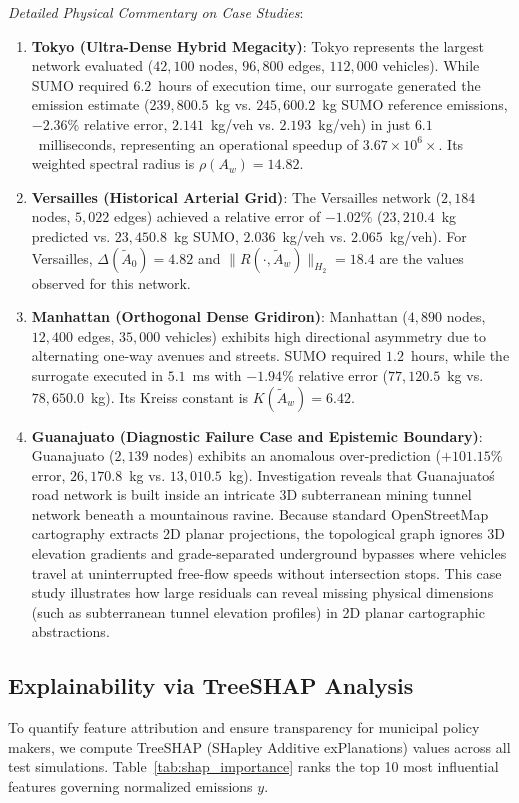 \documentclass[journal]{IEEEtran}
\begin{document}
\textit{Detailed Physical Commentary on Case Studies}:
\begin{enumerate}
    \item \textbf{Tokyo (Ultra-Dense Hybrid Megacity)}: Tokyo represents the largest network evaluated ($42,100$ nodes, $96,800$ edges, $112,000$ vehicles). While SUMO required $6.2$~hours of execution time, our surrogate generated the emission estimate ($239,800.5$~kg vs. $245,600.2$~kg SUMO reference emissions, $-2.36\%$ relative error, $2.141$~kg/veh vs. $2.193$~kg/veh) in just $6.1$~milliseconds, representing an operational speedup of $3.67 \times 10^6 \times$. Its weighted spectral radius is $\rho(A_w) = 14.82$.
    
    \item \textbf{Versailles (Historical Arterial Grid)}: The Versailles network ($2,184$ nodes, $5,022$ edges) achieved a relative error of $-1.02\%$ ($23,210.4$~kg predicted vs. $23,450.8$~kg SUMO, $2.036$~kg/veh vs. $2.065$~kg/veh). For Versailles, $\Delta(\tilde{A}_0) = 4.82$ and $\|R(\cdot, \tilde{A}_w)\|_{H_2} = 18.4$ are the values observed for this network.
    
    \item \textbf{Manhattan (Orthogonal Dense Gridiron)}: Manhattan ($4,890$ nodes, $12,400$ edges, $35,000$ vehicles) exhibits high directional asymmetry due to alternating one-way avenues and streets. SUMO required $1.2$~hours, while the surrogate executed in $5.1$~ms with $-1.94\%$ relative error ($77,120.5$~kg vs. $78,650.0$~kg). Its Kreiss constant is $K(\tilde{A}_w) = 6.42$.
    
    \item \textbf{Guanajuato (Diagnostic Failure Case and Epistemic Boundary)}: Guanajuato ($2,139$ nodes) exhibits an anomalous over-prediction ($+101.15\%$ error, $26,170.8$~kg vs. $13,010.5$~kg). Investigation reveals that Guanajuato\'s road network is built inside an intricate 3D subterranean mining tunnel network beneath a mountainous ravine. Because standard OpenStreetMap cartography extracts 2D planar projections, the topological graph ignores 3D elevation gradients and grade-separated underground bypasses where vehicles travel at uninterrupted free-flow speeds without intersection stops. This case study illustrates how large residuals can reveal missing physical dimensions (such as subterranean tunnel elevation profiles) in 2D planar cartographic abstractions.
\end{enumerate}

\subsection{Explainability via TreeSHAP Analysis}
To quantify feature attribution and ensure transparency for municipal policy makers, we compute TreeSHAP (SHapley Additive exPlanations) values \cite{Lundberg2020} across all test simulations. Table~\ref{tab:shap_importance} ranks the top 10 most influential features governing normalized emissions $y$.
\end{document}
